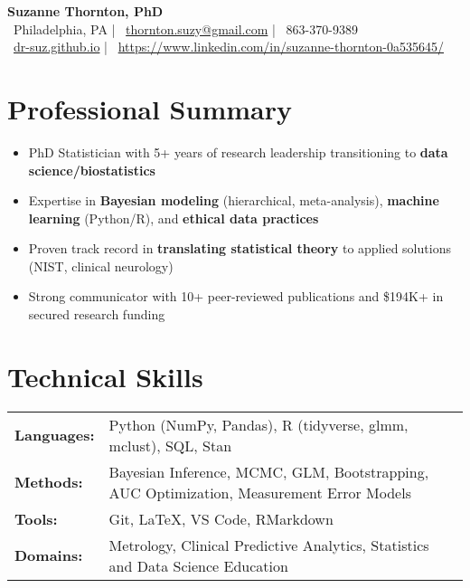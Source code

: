 \documentclass[10pt]{article}
\begin{document}
\begin{center}
    {\Huge\bfseries Suzanne Thornton, PhD} \\[5pt]
    {\large\color{secondary}
    \faMapMarker\ Philadelphia, PA \hspace{0.5em} | \hspace{0.5em}
    \faEnvelope\ \href{mailto:thornton.suzy@gmail.com}{thornton.suzy@gmail.com} \hspace{0.5em} | \hspace{0.5em}
    \faPhone\ 863-370-9389 \\[5pt]
    \faGithub\ \href{https://dr-suz.github.io}{dr-suz.github.io} \hspace{0.5em} | \hspace{0.5em}
    \faLinkedin\ \href{https://www.linkedin.com/in/suzanne-thornton-0a535645/}{https://www.linkedin.com/in/suzanne-thornton-0a535645/} 
    }
\end{center}

\section*{Professional Summary} %
\begin{itemize}[leftmargin=*,nosep]
    \item PhD Statistician with 5+ years of research leadership transitioning to \textbf{data science/biostatistics}
    \item Expertise in \textbf{Bayesian modeling} (hierarchical, meta-analysis), \textbf{machine learning} (Python/R), and \textbf{ethical data practices}
    \item Proven track record in \textbf{translating statistical theory} to applied solutions (NIST, clinical neurology)
    \item Strong communicator with 10+ peer-reviewed publications and \$194K+ in secured research funding
\end{itemize}

\section*{Technical Skills}
\begin{tabular}{@{}ll@{}}
    \textbf{Languages:} & Python (NumPy, Pandas), R (tidyverse, glmm, mclust), SQL, Stan \\
    \textbf{Methods:} & Bayesian Inference, MCMC, GLM, Bootstrapping, AUC Optimization, Measurement Error Models \\
    \textbf{Tools:} & Git, LaTeX, VS Code, RMarkdown \\
    \textbf{Domains:} & Metrology, Clinical Predictive Analytics, Statistics and Data Science Education  
\end{tabular}
\end{document}

